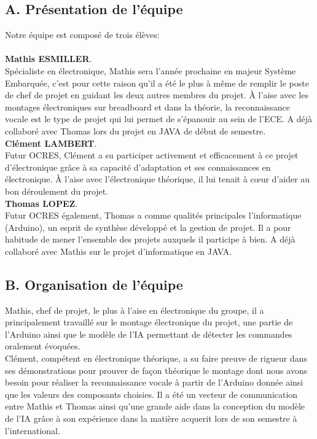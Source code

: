 \documentclass[a4paper,11pt]{book}
\begin{document}
\subsection*{A. Présentation de l'équipe}
Notre équipe est composé de trois élèves:\\ \\

\textbf{Mathis ESMILLER}.\\
Spécialiste en électronique, Mathis sera l'année prochaine en majeur Système Embarquée, c'est pour cette raison qu'il a été le plus à même de remplir le poste de chef de projet en guidant les deux autres membres du projet. À l'aise avec les montages électroniques sur breadboard et dans la théorie, la reconnaissance vocale est le type de projet qui lui permet de s'épanouir au sein de l'ECE. A déjà collaboré avec Thomas lors du projet en JAVA de début de semestre. \\

\textbf{Clément LAMBERT}.\\
Futur OCRES, Clément a su participer activement et efficacement à ce projet d'électronique grâce à sa capacité d'adaptation et ses connaissances en électronique. À l'aise avec l'électronique théorique, il lui tenait à cœur d'aider au bon déroulement du projet. \\

\textbf{Thomas LOPEZ}.\\
Futur OCRES également, Thomas a comme qualités principales l'informatique (Arduino), un esprit de synthèse développé et la gestion de projet. Il a pour habitude de mener l'ensemble des projets auxquels il participe à bien. A déjà collaboré avec Mathis sur le projet d'informatique en JAVA. \\ 

\subsection*{B. Organisation de l'équipe}
Mathis, chef de projet, le plus à l'aise en électronique du groupe, il a principalement travaillé sur le montage électronique du projet, une partie de l'Arduino ainsi que le modèle de l'IA permettant de détecter les commandes oralement évoquées. \\

Clément, compétent en électronique théorique, a su faire preuve de rigueur dans ses démonstrations pour prouver de façon théorique le montage dont nous avons besoin pour réaliser la reconnaissance vocale à partir de l'Arduino donnée ainsi que les valeurs des composants choisies. Il a été un vecteur de communication entre Mathis et Thomas ainsi qu'une grande aide dans la conception du modèle de l'IA grâce à son expérience dans la matière acquerit lors de son semestre à l'international. \\
\end{document}
